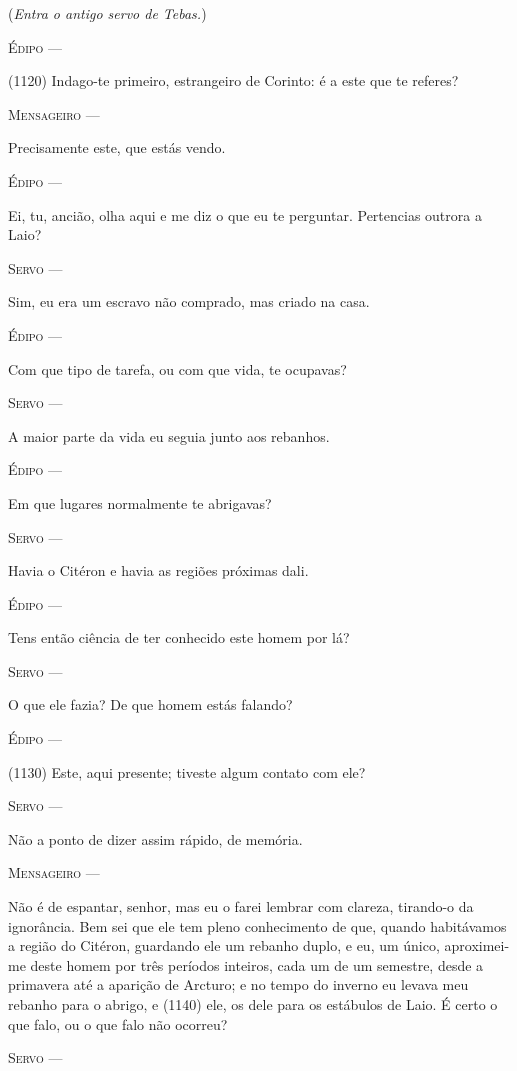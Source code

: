 (\emph{Entra o antigo servo de Tebas.})

\textsc{Édipo} ---

(1120) Indago-te primeiro, estrangeiro de Corinto: é a este que te
referes?

\textsc{Mensageiro} ---

Precisamente este, que estás vendo.

\textsc{Édipo} ---

Ei, tu, ancião, olha aqui e me diz o que eu te perguntar. Pertencias
outrora a Laio?

\textsc{Servo} ---

Sim, eu era um escravo não comprado, mas criado na casa.

\textsc{Édipo} ---

Com que tipo de tarefa, ou com que vida, te ocupavas?

\textsc{Servo} ---

A maior parte da vida eu seguia junto aos rebanhos.

\textsc{Édipo} ---

Em que lugares normalmente te abrigavas?

\textsc{Servo} ---

Havia o Citéron e havia as regiões próximas dali.

\textsc{Édipo} ---

Tens então ciência de ter conhecido este homem por lá?

\textsc{Servo} ---

O que ele fazia? De que homem estás falando?

\textsc{Édipo} ---

(1130) Este, aqui presente; tiveste algum contato com ele?

\textsc{Servo} ---

Não a ponto de dizer assim rápido, de memória.

\textsc{Mensageiro} ---

Não é de espantar, senhor, mas eu o farei lembrar com clareza, tirando-o
da ignorância. Bem sei que ele tem pleno conhecimento de que, quando
habitávamos a região do Citéron, guardando ele um rebanho duplo, e eu,
um único, aproximei-me deste homem por três períodos inteiros, cada um
de um semestre, desde a primavera até a aparição de Arcturo; e no tempo
do inverno eu levava meu rebanho para o abrigo, e (1140) ele, os dele
para os estábulos de Laio. É certo o que falo, ou o que falo não
ocorreu?

\textsc{Servo} ---

